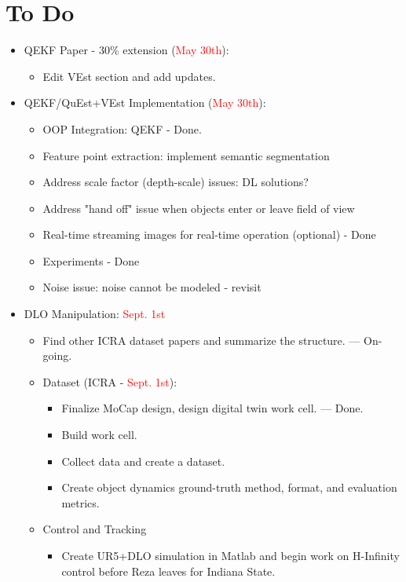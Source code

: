 \documentclass[11pt]{article}
\begin{document}
\section{To Do}
\begin{itemize}
  \item QEKF Paper - 30\% extension (\textcolor{red}{May 30th}):
  \begin{itemize}
      \item Edit VEst section and add updates.
  \end{itemize}
  \item QEKF/QuEst+VEst Implementation (\textcolor{red}{May 30th}):
  \begin{itemize}
      \item OOP Integration: QEKF - Done.
      \item Feature point extraction: implement semantic segmentation
      \item Address scale factor (depth-scale) issues: DL solutions?
      \item Address "hand off" issue when objects enter or leave field of view
      \item Real-time streaming images for real-time operation (optional) - Done
      \item Experiments - Done
      \item Noise issue: noise cannot be modeled - revisit
  \end{itemize}
  \item  DLO Manipulation:  \textcolor{red}{Sept. 1st}
  \begin{itemize}
      \item Find other ICRA dataset papers and summarize the structure. --- On-going.
      \item Dataset (ICRA -  \textcolor{red}{Sept. 1st}):
      \begin{itemize}
            \item Finalize MoCap design, design digital twin work cell. --- Done.
            \item Build work cell.
            \item Collect data and create a dataset.
            \item Create object dynamics ground-truth method, format, and evaluation
            metrics.
      \end{itemize}
      \item Control and Tracking
      \begin{itemize}
            \item Create UR5+DLO simulation in Matlab and begin work on H-Infinity control before Reza leaves for Indiana State.

\end{itemize}
\end{itemize}
\end{itemize}
\end{document}

